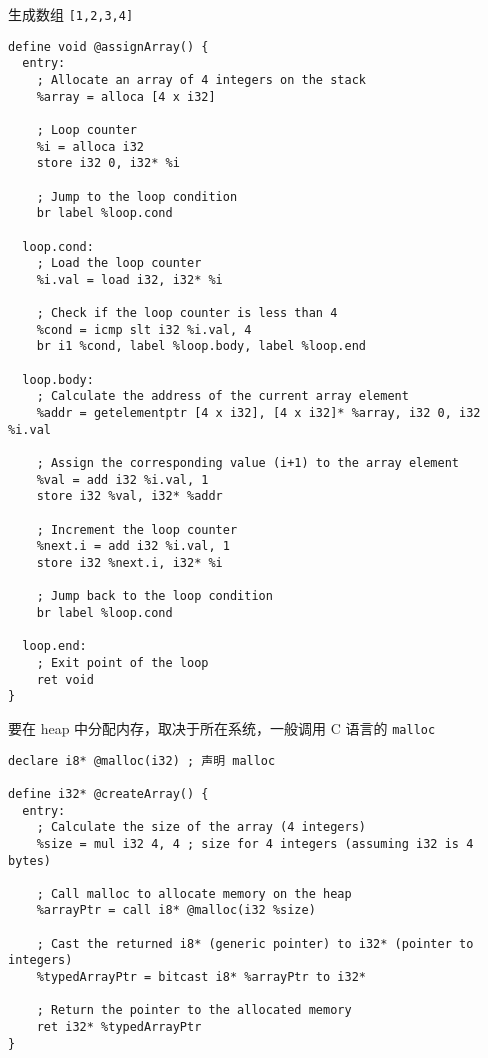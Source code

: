 生成数组 \verb`[1,2,3,4]`
\begin{lstlisting}[language=none]
define void @assignArray() {
  entry:
    ; Allocate an array of 4 integers on the stack
    %array = alloca [4 x i32]

    ; Loop counter
    %i = alloca i32
    store i32 0, i32* %i

    ; Jump to the loop condition
    br label %loop.cond

  loop.cond:
    ; Load the loop counter
    %i.val = load i32, i32* %i

    ; Check if the loop counter is less than 4
    %cond = icmp slt i32 %i.val, 4
    br i1 %cond, label %loop.body, label %loop.end

  loop.body:
    ; Calculate the address of the current array element
    %addr = getelementptr [4 x i32], [4 x i32]* %array, i32 0, i32 %i.val

    ; Assign the corresponding value (i+1) to the array element
    %val = add i32 %i.val, 1
    store i32 %val, i32* %addr

    ; Increment the loop counter
    %next.i = add i32 %i.val, 1
    store i32 %next.i, i32* %i

    ; Jump back to the loop condition
    br label %loop.cond

  loop.end:
    ; Exit point of the loop
    ret void
}
\end{lstlisting}

要在 heap 中分配内存，取决于所在系统，一般调用 C 语言的 \verb`malloc`
\begin{lstlisting}[language=none]
declare i8* @malloc(i32) ; 声明 malloc

define i32* @createArray() {
  entry:
    ; Calculate the size of the array (4 integers)
    %size = mul i32 4, 4 ; size for 4 integers (assuming i32 is 4 bytes)

    ; Call malloc to allocate memory on the heap
    %arrayPtr = call i8* @malloc(i32 %size)

    ; Cast the returned i8* (generic pointer) to i32* (pointer to integers)
    %typedArrayPtr = bitcast i8* %arrayPtr to i32*

    ; Return the pointer to the allocated memory
    ret i32* %typedArrayPtr
}
\end{lstlisting}
